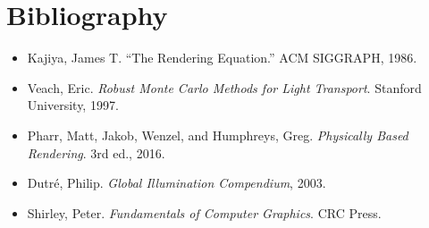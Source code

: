 \documentclass[12pt]{article}
\begin{document}
\section{Bibliography}

\begin{itemize}
    \item Kajiya, James T. “The Rendering Equation.” ACM SIGGRAPH, 1986.
    \item Veach, Eric. \textit{Robust Monte Carlo Methods for Light Transport}. Stanford University, 1997.
    \item Pharr, Matt, Jakob, Wenzel, and Humphreys, Greg. \textit{Physically Based Rendering}. 3rd ed., 2016.
    \item Dutré, Philip. \textit{Global Illumination Compendium}, 2003.
    \item Shirley, Peter. \textit{Fundamentals of Computer Graphics}. CRC Press.
\end{itemize}
\end{document}
